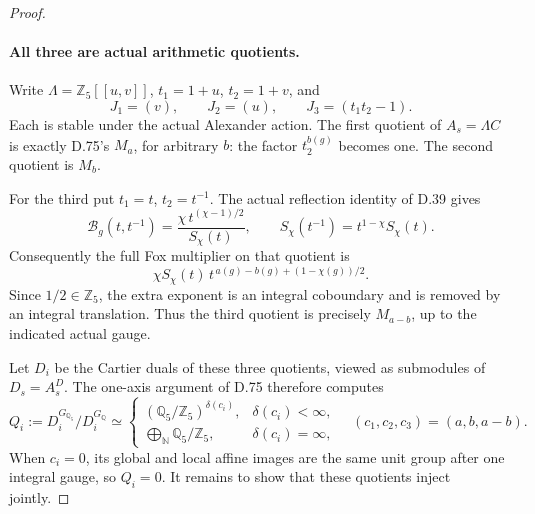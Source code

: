 \begin{proof}
\paragraph{All three are actual arithmetic quotients.}
Write \(\Lambda=\mathbb Z_5[[u,v]]\), \(t_1=1+u\),
\(t_2=1+v\), and
\[
 J_1=(v),\qquad J_2=(u),\qquad J_3=(t_1t_2-1).
 \]
Each is stable under the actual Alexander action.
The first quotient of \(A_s=\Lambda C\) is exactly
D.75's \(M_a\), for arbitrary \(b\): the factor \(t_2^{b(g)}\)
becomes one. The second quotient is \(M_b\).

For the third put \(t_1=t\), \(t_2=t^{-1}\).
The actual reflection identity of D.39 gives
\[
 \mathcal B_g(t,t^{-1})
             =\frac{\chi\,t^{(\chi-1)/2}}{S_\chi(t)},
 \qquad
 S_\chi(t^{-1})=t^{1-\chi}S_\chi(t).
 \]
Consequently the full Fox multiplier on that quotient is
\[
              \chi S_\chi(t)\,
                   t^{\,a(g)-b(g)+(1-\chi(g))/2}.       \tag{D.76.4}
\]
Since \(1/2\in\mathbb Z_5\), the extra exponent is an
integral coboundary and is removed by an integral translation.
Thus the third quotient is precisely \(M_{a-b}\), up to
the indicated actual gauge.

Let \(D_i\) be the Cartier duals of these three quotients,
viewed as submodules of \(D_s=A_s^D\).
The one-axis argument of D.75 therefore computes
\[
 Q_i:=D_i^{G_{\mathbb Q_5}}/D_i^{G_{\mathbb Q}}
 \simeq
 \begin{cases}
  (\mathbb Q_5/\mathbb Z_5)^{\delta(c_i)},&
                         \delta(c_i)<\infty,\\
  \displaystyle\bigoplus_{\mathbb N}\mathbb Q_5/\mathbb Z_5,&
                         \delta(c_i)=\infty,
 \end{cases}
 \quad(c_1,c_2,c_3)=(a,b,a-b).                           \tag{D.76.5}
\]
When \(c_i=0\), its global and local affine images are
the same unit group after one integral gauge, so \(Q_i=0\).
It remains to show that these quotients inject jointly.


\end{proof}
